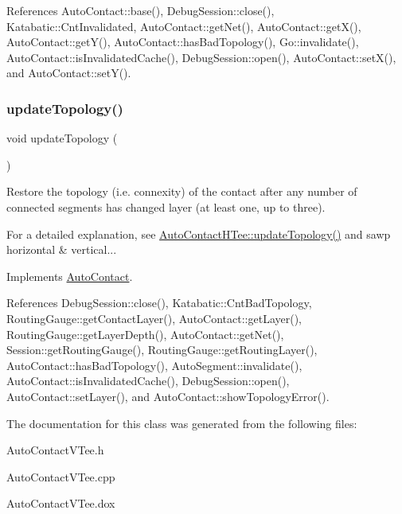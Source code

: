 References Auto\+Contact\+::base(), Debug\+Session\+::close(), Katabatic\+::\+Cnt\+Invalidated, Auto\+Contact\+::get\+Net(), Auto\+Contact\+::get\+X(), Auto\+Contact\+::get\+Y(), Auto\+Contact\+::has\+Bad\+Topology(), Go\+::invalidate(), Auto\+Contact\+::is\+Invalidated\+Cache(), Debug\+Session\+::open(), Auto\+Contact\+::set\+X(), and Auto\+Contact\+::set\+Y().

\mbox{\label{classKatabatic_1_1AutoContactVTee_af5bf1f5e71204ef84346e4e036175431}} 
\subsubsection{\texorpdfstring{update\+Topology()}{updateTopology()}}
{\footnotesize\ttfamily void update\+Topology (\begin{DoxyParamCaption}{ }\end{DoxyParamCaption})\hspace{0.3cm}{\ttfamily [virtual]}}

Restore the topology (i.\+e. connexity) of the contact after any number of connected segments has changed layer (at least one, up to three).

For a detailed explanation, see \mbox{\hyperlink{classKatabatic_1_1AutoContactHTee_af5bf1f5e71204ef84346e4e036175431}{Auto\+Contact\+H\+Tee\+::update\+Topology()}} and sawp horizontal \& vertical... 

Implements \mbox{\hyperlink{classKatabatic_1_1AutoContact_a690764ddc997fe9766a79c4b8e0c3e2f}{Auto\+Contact}}.



References Debug\+Session\+::close(), Katabatic\+::\+Cnt\+Bad\+Topology, Routing\+Gauge\+::get\+Contact\+Layer(), Auto\+Contact\+::get\+Layer(), Routing\+Gauge\+::get\+Layer\+Depth(), Auto\+Contact\+::get\+Net(), Session\+::get\+Routing\+Gauge(), Routing\+Gauge\+::get\+Routing\+Layer(), Auto\+Contact\+::has\+Bad\+Topology(), Auto\+Segment\+::invalidate(), Auto\+Contact\+::is\+Invalidated\+Cache(), Debug\+Session\+::open(), Auto\+Contact\+::set\+Layer(), and Auto\+Contact\+::show\+Topology\+Error().



The documentation for this class was generated from the following files\+:\begin{DoxyCompactItemize}
\item 
Auto\+Contact\+V\+Tee.\+h\item 
Auto\+Contact\+V\+Tee.\+cpp\item 
Auto\+Contact\+V\+Tee.\+dox\end{DoxyCompactItemize}
